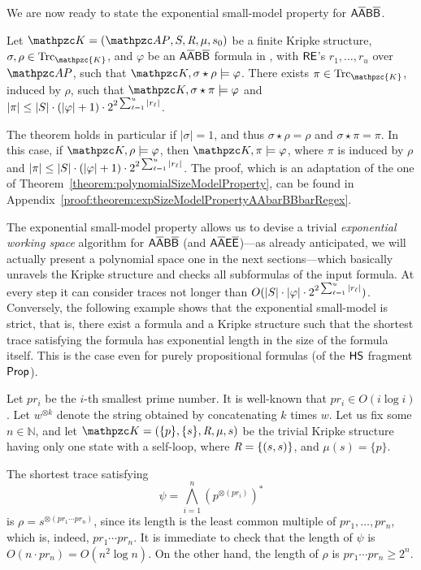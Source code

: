 We are now ready to state the exponential small-model property for $\mathsf{A\overline{A}B\overline{B}}$.
\begin{theorem}\label{theorem:expSizeModelPropertyAAbarBBbarRegex}
Let $\Ku=(\Prop,\States,\allowbreak \Edges,\Lab,\sinit)$ be a finite Kripke structure, $\sigma,\rho \in \Trk_\mathpzc{K}$, and $\varphi$ be an $\mathsf{A\overline{A}B\overline{B}}$ formula in \nnf{}, with $\mathsf{RE}$'s  $r_1,\ldots ,r_u$ over $\Prop$, such that $\Ku,\sigma\star\rho\models \varphi$. There exists $\pi\in \Trk_\mathpzc{K}$, induced by $\rho$, such that $\Ku,\sigma\star\pi\models \varphi$ and $|\pi|\leq |S|\cdot (|\varphi|+1) \cdot 2^{2\sum_{\ell=1}^u |r_\ell|}$.
\end{theorem}
%
The theorem holds in particular if $|\sigma|\!=\!1$, and thus $\sigma\star\rho\!=\!\rho$ and $\sigma\star\pi\!=\!\pi$. In this case, if $\Ku,\rho\models \varphi$, then $\Ku,\pi\models \varphi$, where $\pi$ is induced by $\rho$ and $|\pi|\leq |S|\cdot (|\varphi|+1) \cdot 2^{2\sum_{\ell=1}^u |r_\ell|}$. 
The proof, which is an adaptation of the one of Theorem~\ref{theorem:polynomialSizeModelProperty}, can be found in Appendix~\ref{proof:theorem:expSizeModelPropertyAAbarBBbarRegex}.


The exponential small-model property allows us to devise a trivial \emph{exponential working space} algorithm for $\mathsf{A\overline{A}B\overline{B}}$ (and $\mathsf{A\overline{A}E\overline{E}}$)---as already anticipated, we will actually present a polynomial space 
one in the next sections---which basically unravels the Kripke structure and %
checks all subformulas of the input formula. At every step it can consider traces not longer than $O(|S|\cdot |\varphi| \cdot 2^{2\sum_{\ell=1}^u |r_\ell|})$. 
Conversely, the following example shows that the exponential small-model is strict, that is, there exist a formula and a Kripke structure such that the shortest trace satisfying the formula has exponential length in the size of the formula itself. This is the case even for purely propositional formulas (of the $\text{\sffamily HS}$ fragment $\mathsf{Prop}$).
\begin{example} 
Let $pr_i$ be the $i$-th smallest prime number. It is well-known that $pr_i\in O(i\log i)$. Let $w^{\otimes k}$ denote the string obtained by concatenating $k$ times $w$.
%
Let us fix some $n\in\mathbb{N}$, and 
let $\Ku=(\{p\},\{s\}, \Edges,\mu,s)$ be the trivial Kripke structure having only one state with a self-loop, where $\textit{R}=\{(s,s)\}$, and $\mu(s)=\{p\}$.

The shortest trace satisfying \[\psi=\bigwedge_{i=1}^n (p^{\otimes (pr_i)})^*\] is $\rho=s^{\otimes (pr_1\cdots pr_n)}$, since its length is the least common multiple of $pr_1,\ldots, pr_n$, which is, indeed, $pr_1\cdots pr_n$.
%
It is immediate to check that the length of $\psi$ is $O(n\cdot pr_n)=O(n^2\log n)$. On the other hand, the length of $\rho$ is $pr_1\cdots pr_n \geq 2^n$.
\end{example}

